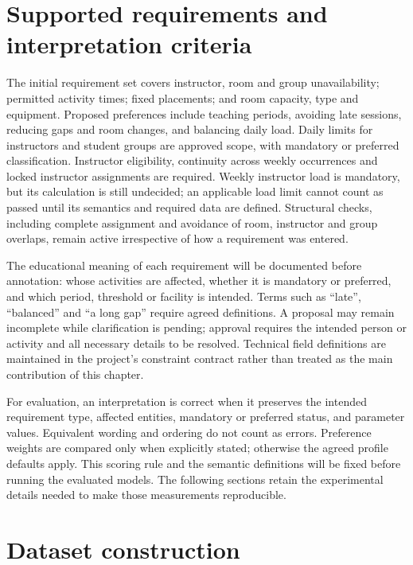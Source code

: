 \documentclass[
  11pt,a4paper,oneside]{report}
\begin{document}
\section{Supported requirements and interpretation criteria}\label{formal-representation-of-supported-constraints}
The initial requirement set covers instructor, room and group unavailability; permitted activity times; fixed placements; and room capacity, type and equipment. Proposed preferences include teaching periods, avoiding late sessions, reducing gaps and room changes, and balancing daily load. Daily limits for instructors and student groups are approved scope, with mandatory or preferred classification. Instructor eligibility, continuity across weekly occurrences and locked instructor assignments are required. Weekly instructor load is mandatory, but its calculation is still undecided; an applicable load limit cannot count as passed until its semantics and required data are defined. Structural checks, including complete assignment and avoidance of room, instructor and group overlaps, remain active irrespective of how a requirement was entered.

The educational meaning of each requirement will be documented before annotation: whose activities are affected, whether it is mandatory or preferred, and which period, threshold or facility is intended. Terms such as ``late'', ``balanced'' and ``a long gap'' require agreed definitions. A proposal may remain incomplete while clarification is pending; approval requires the intended person or activity and all necessary details to be resolved. Technical field definitions are maintained in the project's constraint contract rather than treated as the main contribution of this chapter.

For evaluation, an interpretation is correct when it preserves the intended requirement type, affected entities, mandatory or preferred status, and parameter values. Equivalent wording and ordering do not count as errors. Preference weights are compared only when explicitly stated; otherwise the agreed profile defaults apply. This scoring rule and the semantic definitions will be fixed before running the evaluated models. The following sections retain the experimental details needed to make those measurements reproducible.

\hypertarget{dataset-construction}{%
\section{Dataset construction}\label{dataset-construction}}
\end{document}
